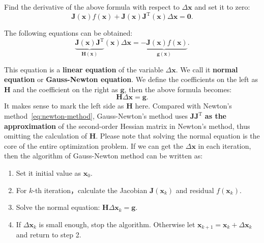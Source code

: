 Find the derivative of the above formula with respect to $\Delta \mathbf{x}$ and set it to zero:
\begin{displaymath}
    \mathbf{J} {\left( \mathbf{x} \right)}f\left( \mathbf{x} \right) + \mathbf{J} {\left( \mathbf{x} \right)} \mathbf{J}^\mathrm{T} \left( \mathbf{x} \right)\Delta \mathbf{x} = \mathbf{0}.
\end{displaymath}

The following equations can be obtained:
\begin{equation}
    \underbrace{\mathbf{J} {\left( \mathbf{x} \right)} \mathbf{J}^\mathrm{T}}_{\mathbf{H}(\mathbf{x})} \left( \mathbf{x} \right)\Delta \mathbf{x} =  \underbrace{- \mathbf{J} {\left( \mathbf{x} \right)} f\left( \mathbf{x} \right)}_{\mathbf{g}(\mathbf{x})}.
\end{equation}

This equation is a \textbf{linear equation} of the variable $\Delta \mathbf{x}$. We call it \textbf{normal equation} or \textbf{Gauss-Newton equation}. We define the coefficients on the left as $\mathbf{H}$ and the coefficient on the right as $\mathbf{g}$, then the above formula becomes:
\begin{equation}
    \label{eq:minimize-deltax}
    \mathbf{H} \Delta \mathbf{x} = \mathbf{g}.
\end{equation}
It makes sense to mark the left side as $\mathbf{H}$ here. Compared with Newton's method~\ref{eq:newton-method}, Gauss-Newton's method uses $\mathbf{J}\mathbf{J}^\mathrm{T}$ \textbf{as the approximation} of the second-order Hessian matrix in Newton's method, thus omitting the calculation of $\mathbf{H}$. Please note that solving the normal equation is the core of the entire optimization problem. If we can get the $\Delta \mathbf{x}$ in each iteration, then the algorithm of Gauss-Newton method can be written as:

\begin{mdframed}
    \begin{enumerate}
        \item Set it initial value as $\mathbf{x}_0$.
        \item For $k$-th iteration，calculate the Jacobian $\mathbf{J}(\mathbf{x}_k)$ and residual $f(\mathbf{x}_k)$.
        \item Solve the normal equation: $\mathbf{H} \Delta \mathbf{x}_k = \mathbf{g}$.
        \item If $\Delta \mathbf{x}_k$ is small enough, stop the algorithm. Otherwise let $\mathbf{x}_{k+1} = \mathbf{x}_k+\Delta \mathbf{x}_k$ and return to step 2.
    \end{enumerate}
\end{mdframed}

